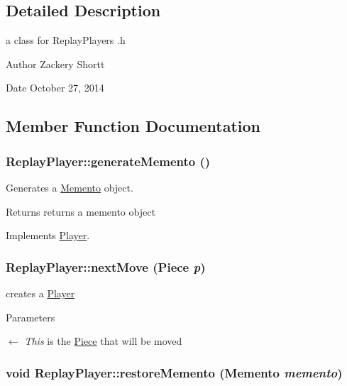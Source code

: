 \subsection{Detailed Description}
a class for ReplayPlayers .h \begin{DoxyAuthor}{Author}
Zackery Shortt 
\end{DoxyAuthor}
\begin{DoxyDate}{Date}
October 27, 2014 
\end{DoxyDate}


\subsection{Member Function Documentation}
\hypertarget{classReplayPlayer_a9301be927a78f52b14602f6660ce35c4}{
\subsubsection[{generateMemento}]{ ReplayPlayer::generateMemento ()}}
\label{classReplayPlayer_a9301be927a78f52b14602f6660ce35c4}


Generates a \hyperlink{classMemento}{Memento} object. \begin{DoxyReturn}{Returns}
returns a memento object 
\end{DoxyReturn}


Implements \hyperlink{classPlayer_ae0b947230fe2f09d96f273798f19cf0d}{Player}.\hypertarget{classReplayPlayer_a39c2542b03506ff19487dc8675741298}{
\subsubsection[{nextMove}]{\setlength{\rightskip}{0pt plus 5cm}ReplayPlayer::nextMove ({\bf Piece} {\em p})}}
\label{classReplayPlayer_a39c2542b03506ff19487dc8675741298}


creates a \hyperlink{classPlayer}{Player} 
\begin{DoxyParams}{Parameters}
\item[\mbox{$\leftarrow$} {\em This}]is the \hyperlink{classPiece}{Piece} that will be moved \end{DoxyParams}
\hypertarget{classReplayPlayer_af45543802dc6f5ac1f7d8f2582c7a04e}{
\subsubsection[{restoreMemento}]{\setlength{\rightskip}{0pt plus 5cm}void ReplayPlayer::restoreMemento ({\bf Memento} {\em memento})}}
\label{classReplayPlayer_af45543802dc6f5ac1f7d8f2582c7a04e}


